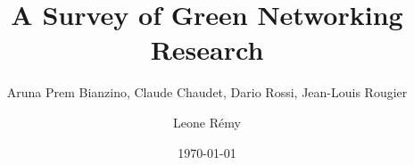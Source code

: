 \author{Leone Rémy}
\title{A Survey of Green Networking Research}
\subtitle{Aruna Prem Bianzino, Claude Chaudet, Dario Rossi, Jean-Louis Rougier}
\date{\today}
